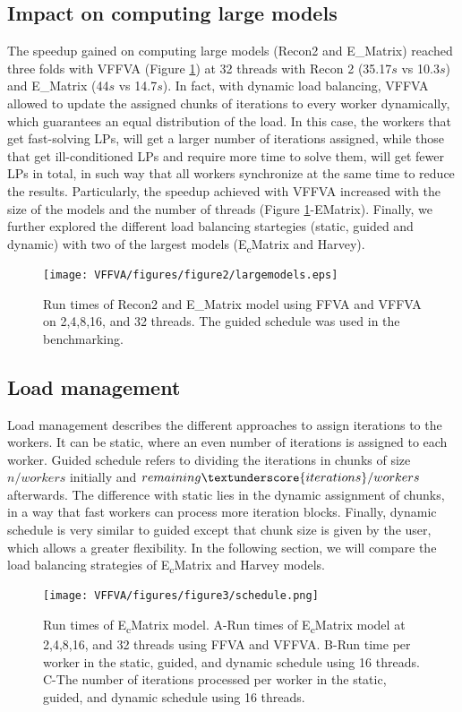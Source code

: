 \subsection*{Impact on computing large models}
The speedup gained on computing large models (Recon2 and E\_Matrix) reached three folds with VFFVA (Figure \ref{fig:largemodel.}) at 32 threads with Recon 2 (35.17$s$ vs 10.3$s$) and E\_Matrix (44$s$ vs 14.7$s$). In fact, with dynamic load balancing, VFFVA allowed to update the assigned chunks of iterations to every worker dynamically, which guarantees an equal distribution of the load. In this case, the workers that get fast-solving LPs, will get a larger number of iterations assigned, while those that get ill-conditioned LPs and require more time to solve them, will get fewer LPs in total, in such way that all workers synchronize at the same time to reduce the results. Particularly, the speedup achieved with VFFVA increased with the size of the models and the number of threads (Figure \ref{fig:largemodel.}-E\textunderscore Matrix). 
Finally, we further explored the different load balancing startegies (static, guided and dynamic) with two of the largest models (E\textsubscript{c}\textunderscore Matrix and Harvey).
\begin{figure}[!htp]
\centering
\texttt{[image: VFFVA/figures/figure2/largemodels.eps]}
\caption[Run times of Recon2 and E\textunderscore Matrix model.]{Run times of Recon2 and E\_Matrix model using FFVA and VFFVA on 2,4,8,16, and 32 threads. The guided schedule was used in the benchmarking.}
\label{fig:largemodel.}
\end{figure}
\subsection*{Load management}
Load management describes the different approaches to assign iterations to the workers. It can be static, where an even number of iterations is assigned to each worker. Guided schedule refers to dividing the iterations in chunks of size $n/workers$ initially and $remaining\textunderscore{iterations}/workers$ afterwards. The difference with static lies in the dynamic assignment of chunks, in a way that fast workers can process more iteration blocks. Finally, dynamic schedule is very similar to guided except that chunk size is given by the user, which allows a greater flexibility. In the following section, we will compare the load balancing strategies of E\textsubscript{c}\textunderscore Matrix and Harvey models.\\
\begin{figure}[!htp]
\centering
\texttt{[image: VFFVA/figures/figure3/schedule.png]}
\caption[Run times of E\textsubscript{c}\textunderscore Matrix model.]{Run times of E\textsubscript{c}\textunderscore Matrix model. A-Run times of E\textsubscript{c}\textunderscore Matrix model at 2,4,8,16, and 32 threads using FFVA and VFFVA. B-Run time per worker in the static, guided, and dynamic schedule using 16 threads. C-The number of iterations processed per worker in the static, guided, and dynamic schedule using 16 threads.}
\label{fig:static.}
\end{figure}
